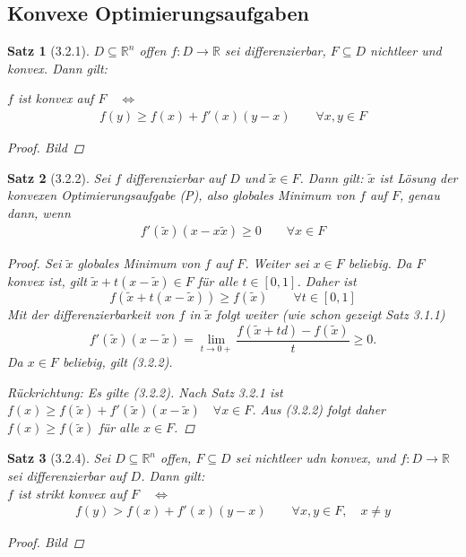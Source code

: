 \documentclass[ngerman,halfparskip]{scrartcl}
\newtheorem*{satz}{Satz}
\theoremstyle{definition}
\def\R{\mathbb R}
\begin{document}
\subsection*{Konvexe Optimierungsaufgaben}
\begin{satz}[3.2.1] $ D\subseteq \R^n $ offen $ f:D\rightarrow \R $ sei differenzierbar, $ F\subseteq D $ nichtleer und konvex. Dann gilt: 

$ f $ ist konvex auf $ F \quad \Leftrightarrow$
\begin{gather}\tag{3.2.1} f(y)\geq f(x)+f'(x)(y-x) \qquad \forall x,y\in F\end{gather}
\begin{proof}
Bild
\end{proof}

\end{satz}


\begin{satz}[3.2.2]
Sei $f$ differenzierbar auf $D$ und $\tilde x\in F$. Dann gilt: $\tilde x$ ist Lösung der konvexen Optimierungsaufgabe (P), also globales Minimum von $f$ auf $F$, genau dann, wenn 
\begin{gather*}\tag{3.2.2}
f'(\tilde x)(x-x\tilde x)\geq 0 \qquad \forall x\in F
\end{gather*}

\begin{proof}
Sei $\tilde x$ globales Minimum von $f$ auf $F$. Weiter sei $x\in F$ beliebig. Da $F$ konvex ist, gilt $\tilde x + t(x-\tilde x)\in F$ für alle $t\in [0,1]$. Daher ist $$f(\tilde x +t(x-\tilde x))\geq f(\tilde x)\qquad \forall t\in [0,1]$$ Mit der differenzierbarkeit von $f$ in $\tilde x$ folgt weiter (wie schon gezeigt Satz 3.1.1) $$ f'(\tilde x)(x-\tilde x) =\lim\limits _{t\to 0+}\frac{f(\tilde x + td) - f(\tilde x)}t\geq 0.$$ Da $x\in F$ beliebig, gilt (3.2.2).

Rückrichtung: Es gilte (3.2.2). Nach Satz 3.2.1  ist $ f(x)\geq f(\tilde x)+f'(\tilde x)(x-\tilde x) \quad \forall x\in F$. Aus (3.2.2) folgt daher $f(x)\geq f(\tilde x)$ für alle $x\in F$.
\end{proof}
\end{satz}

\begin{satz}[3.2.4]
Sei $D\subseteq \R^n$ offen, $F\subseteq D$ sei nichtleer udn konvex, und $f:D\to\R$ sei differenzierbar auf $D$. Dann gilt:\\ $f$ ist strikt konvex auf $F \quad \Leftrightarrow$
\begin{gather*}\tag{3.2.3}
f(y)>f(x)+f'(x)(y-x) \qquad \forall x,y\in F, \quad x\neq y
\end{gather*}
\begin{proof}
Bild
\end{proof}
\end{satz}
\end{document}
